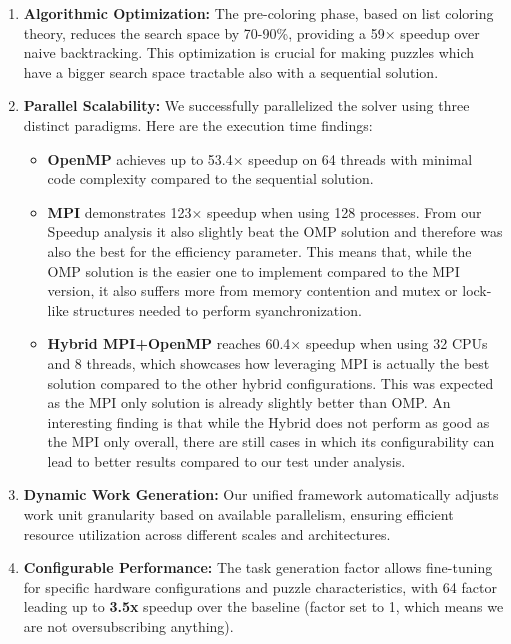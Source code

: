 \begin{enumerate}
    \item \textbf{Algorithmic Optimization:} The pre-coloring phase, based on list coloring theory, reduces the search space by 70-90\%, providing a 59× speedup over naive backtracking. This optimization is crucial for making puzzles which have a bigger search space tractable also with a sequential solution.
    
    \item \textbf{Parallel Scalability:} We successfully parallelized the solver using three distinct paradigms. Here are the execution time findings:
    \begin{itemize}
        \item \textbf{OpenMP} achieves up to 53.4× speedup on 64 threads with minimal code complexity compared to the sequential solution.
        \item \textbf{MPI} demonstrates 123× speedup when using 128 processes. From our Speedup analysis it also slightly beat the OMP solution and therefore was also the best for the efficiency parameter. This means that, while the OMP solution is the easier one to implement compared to the MPI version, it also suffers more from memory contention and mutex or lock-like structures needed to perform syanchronization.
        \item \textbf{Hybrid MPI+OpenMP} reaches 60.4× speedup when using 32 CPUs and 8 threads, which showcases how leveraging MPI is actually the best solution compared to the other hybrid configurations. This was expected as the MPI only solution is already slightly better than OMP. An interesting finding is that while the Hybrid does not perform as good as the MPI only overall, there are still cases in which its configurability can lead to better results compared to our test under analysis.
    \end{itemize}
    
    \item \textbf{Dynamic Work Generation:} Our unified framework automatically adjusts work unit granularity based on available parallelism, ensuring efficient resource utilization across different scales and architectures.
    
    \item \textbf{Configurable Performance:} The task generation factor allows fine-tuning for specific hardware configurations and puzzle characteristics, with 64 factor leading up to \textbf{3.5x} speedup over the baseline (factor set to 1, which means we are not oversubscribing anything).
\end{enumerate}

